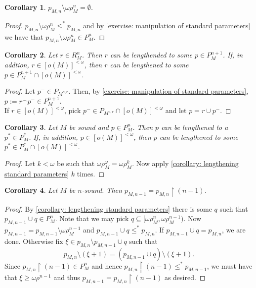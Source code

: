 \documentclass[12pt,a4paper]{article}
\theoremstyle{nicestyle}
\newtheorem{corollary}{Corollary}[subsection]
\begin{document}
  \begin{corollary}
    $p_{M,n} \setminus \omega\rho^{n}_{M} = \emptyset$.
  \end{corollary}

  \begin{proof}
    $p_{M,n} \setminus \omega\rho^{n}_{M} \le^{*} p_{M,n}$ and by
    \autoref{exercise: manipulation of standard parameters} we have
    that $p_{M,n} \setminus \omega\rho^{n}_{M} \in P^{n}_{M}$.
  \end{proof}

  \begin{corollary} \label{corollary: lengthening standard parameters}
    Let $r \in R^{n}_{M}$. Then $r$ can be lengthended to some
    $p \in P^{n+1}_{M}$. If, in addtion, $r \in [o(M)]^{< \omega}$,
    then $r$ can be lengthened to some
    $p \in P^{n+1}_{M} \cap [o(M)]^{<\omega}$.
  \end{corollary}

  \begin{proof}
    Let $p^{-} \in P_{M^{n, r}}$. Then, by \autoref{exercise:
      manipulation of standard parameters},
    $p := r ^{\frown} p^{-} \in P^{n+1}_{M}$. \\
    If $r \in [o(M)]^{< \omega}$, pick
    $p^{-} \in P_{M^{n, r}} \cap [o(M)]^{< \omega}$ and let
    $p = r \cup p^{-}$.
  \end{proof}

  \begin{corollary}
    Let $M$ be sound and $p \in P^{n}_{M}$. Then $p$ can be lengthened
    to a $p^{*} \in P^{*}_{M}$. If, in addition,
    $p \in [o(M)]^{<\omega}$, then $p$ can be lengthened to some
    $p^{*} \in P^{*}_{M} \cap [o(M)]^{<\omega}$.
  \end{corollary}

  \begin{proof}
    Let $k < \omega$ be such that
    $\omega\rho_{M}^{\omega} = \omega \rho_{M}^{k}$. Now apply
    \autoref{corollary: lengthening standard parameters} $k$
    times.
  \end{proof}

  \begin{corollary}
    Let $M$ be $n$-sound. Then
    $p_{M, n-1} = p_{M,n} \restriction (n-1)$.
  \end{corollary}

  \begin{proof}
    By \autoref{corollary: lengthening standard parameters} there is
    some $q$ such that $p_{M, n-1} \cup q \in P^{n}_{M}$. Note that we
    may pick $q \subseteq [\omega\rho^{n}_{M},
    \omega\rho^{n-1}_{M})$. Now
    $p_{M, n-1} = p_{M, n-1} \setminus \omega\rho^{n-1}_{M}$ and
    $p_{M, n-1} \cup q \le^{*} p_{M,n}$. If
    $p_{M, n-1} \cup q = p_{M,n}$, we are done. Otherwise fix
    $\xi \in p_{M,n} \setminus p_{M, n-1} \cup q$ such that
    \[
      p_{M,n} \setminus (\xi + 1) = (p_{M, n-1} \cup q) \setminus (\xi
      + 1).
    \]
    Since $p_{M,n} \restriction (n-1) \in P^{n}_{M}$ and hence
    $p_{M,n} \restriction (n-1) \le^{*} p_{M, n-1}$, we must have that
    $\xi \ge \omega\rho^{n-1}$ and thus
    $p_{M, n-1} = p_{M,n} \restriction (n-1)$ as desired.
  \end{proof}
  
\end{document}
